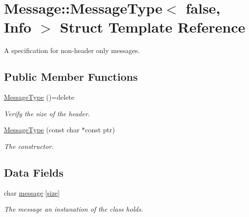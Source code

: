 \hypertarget{struct_message_1_1_message_type_3_01false_00_01_info_01_4}{}\section{Message\+:\+:Message\+Type$<$ false, Info $>$ Struct Template Reference}
\label{struct_message_1_1_message_type_3_01false_00_01_info_01_4}


A specification for non-\/header only messages.  


\subsection*{Public Member Functions}
\begin{DoxyCompactItemize}
\item 
\hyperlink{struct_message_1_1_message_type_3_01false_00_01_info_01_4_a04fccf2c4ae16dded9efa697c7f2885f}{Message\+Type} ()=delete
\begin{DoxyCompactList}\small\item\em Verify the size of the header. \end{DoxyCompactList}\item 
\hyperlink{struct_message_1_1_message_type_3_01false_00_01_info_01_4_af6312418240388ee671582bb3eb8ba64}{Message\+Type} (const char $\ast$const ptr)
\begin{DoxyCompactList}\small\item\em The constructor. \end{DoxyCompactList}\end{DoxyCompactItemize}
\subsection*{Data Fields}
\begin{DoxyCompactItemize}
\item 
char \hyperlink{struct_message_1_1_message_type_3_01false_00_01_info_01_4_af9557cb65a7883b01c7cbe30e6211f98}{message} \mbox{[}\hyperlink{struct_message_1_1_message_type_3_01false_00_01_info_01_4_ab1478611666e0b38703dbb0512262d32}{size}\mbox{]}
\begin{DoxyCompactList}\small\item\em The message an instanation of the class holds. \end{DoxyCompactList}\end{DoxyCompactItemize}
